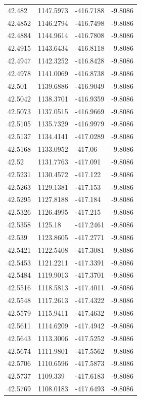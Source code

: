 \begin{table}[H]
\begin{tabular}{llll}
42.482 & 1147.5973 & -416.7188 & -9.8086 \\
42.4852 & 1146.2794 & -416.7498 & -9.8086 \\
42.4884 & 1144.9614 & -416.7808 & -9.8086 \\
42.4915 & 1143.6434 & -416.8118 & -9.8086 \\
42.4947 & 1142.3252 & -416.8428 & -9.8086 \\
42.4978 & 1141.0069 & -416.8738 & -9.8086 \\
42.501 & 1139.6886 & -416.9049 & -9.8086 \\
42.5042 & 1138.3701 & -416.9359 & -9.8086 \\
42.5073 & 1137.0515 & -416.9669 & -9.8086 \\
42.5105 & 1135.7329 & -416.9979 & -9.8086 \\
42.5137 & 1134.4141 & -417.0289 & -9.8086 \\
42.5168 & 1133.0952 & -417.06 & -9.8086 \\
42.52 & 1131.7763 & -417.091 & -9.8086 \\
42.5231 & 1130.4572 & -417.122 & -9.8086 \\
42.5263 & 1129.1381 & -417.153 & -9.8086 \\
42.5295 & 1127.8188 & -417.184 & -9.8086 \\
42.5326 & 1126.4995 & -417.215 & -9.8086 \\
42.5358 & 1125.18 & -417.2461 & -9.8086 \\
42.539 & 1123.8605 & -417.2771 & -9.8086 \\
42.5421 & 1122.5408 & -417.3081 & -9.8086 \\
42.5453 & 1121.2211 & -417.3391 & -9.8086 \\
42.5484 & 1119.9013 & -417.3701 & -9.8086 \\
42.5516 & 1118.5813 & -417.4011 & -9.8086 \\
42.5548 & 1117.2613 & -417.4322 & -9.8086 \\
42.5579 & 1115.9411 & -417.4632 & -9.8086 \\
42.5611 & 1114.6209 & -417.4942 & -9.8086 \\
42.5643 & 1113.3006 & -417.5252 & -9.8086 \\
42.5674 & 1111.9801 & -417.5562 & -9.8086 \\
42.5706 & 1110.6596 & -417.5873 & -9.8086 \\
42.5737 & 1109.339 & -417.6183 & -9.8086 \\
42.5769 & 1108.0183 & -417.6493 & -9.8086 \\

\end{tabular}
\end{table}
